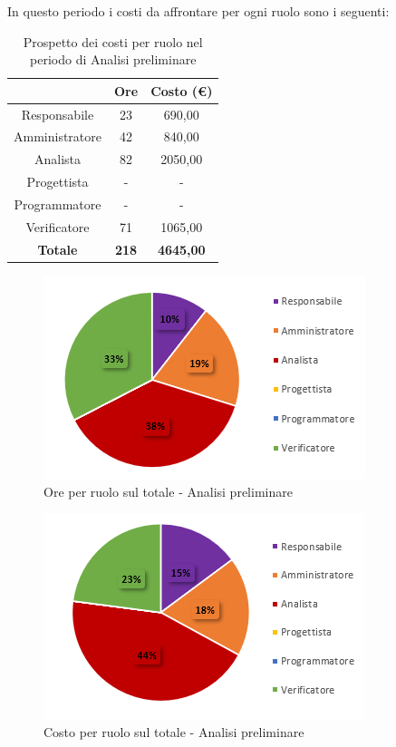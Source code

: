 \pagebreak
In questo periodo i costi da affrontare per ogni ruolo sono i seguenti:

\begin{table}[H]
    \centering
    \renewcommand{\arraystretch}{1.8}
    \begin{tabular}{c|c|c}
      \rowcolor[HTML]{125E28} 
      \multicolumn{1}{c}{\color[HTML]{FFFFFF}\textbf{Ruolo}}
      & \multicolumn{1}{c}{\color[HTML]{FFFFFF}\textbf{Ore}}
      & \multicolumn{1}{c}{\color[HTML]{FFFFFF}\textbf{Costo (€)}}\\
      \hline
      Responsabile      & 23 & 690,00\\
      Amministratore    & 42 & 840,00\\
      Analista          & 82 & 2050,00\\
      Progettista       & - & -\\
      Programmatore     & - & -\\
      Verificatore      & 71 & 1065,00\\
      \textbf{Totale} & \textbf{218} & \textbf{4645,00}
    \end{tabular}
    \caption{Prospetto dei costi per ruolo nel periodo di Analisi preliminare}
  \end{table}

  \begin{figure}[H]
    \centering
     \includegraphics[scale=1]{immagini/ore_ruolo_analisi.png}
     \caption{Ore per ruolo sul totale - Analisi preliminare}
   \end{figure}

  \begin{figure}[H]
    \centering
     \includegraphics[scale=1]{immagini/costo_ruolo_analisi.png}
     \caption{Costo per ruolo sul totale - Analisi preliminare}
   \end{figure}

